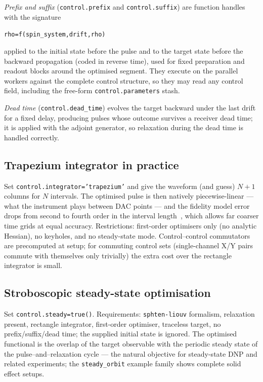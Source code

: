 \documentclass[11pt,a4paper]{article}
\newcommand{\code}[1]{\texttt{#1}}
\begin{document}
\emph{Prefix and suffix} (\code{control.prefix} and
\code{control.suffix}) are function handles with the signature
\begin{center}
\code{rho=f(spin\_system,drift,rho)}
\end{center}
applied to the initial state before the pulse and to the target state
before the backward propagation (coded in reverse time), used for fixed
preparation and readout blocks around the optimised segment. They execute on the parallel workers
against the complete control structure, so they may read any control
field, including the free-form \code{control.parameters} stash.

\emph{Dead time} (\code{control.dead\_time}) evolves the target backward
under the last drift for a fixed delay, producing pulses whose outcome
survives a receiver dead time; it is applied with the adjoint generator,
so relaxation during the dead time is handled correctly.

\subsection{Trapezium integrator in practice}

Set \code{control.integrator='trapezium'} and give the waveform (and
guess) $N+1$ columns for $N$ intervals. The optimised pulse is then
natively piecewise-linear --- what the instrument plays between DAC
points --- and the fidelity model error drops from second to fourth
order in the interval length~\cite{rasulov2023}, which allows far
coarser time grids at equal accuracy. Restrictions: first-order
optimisers only (no analytic Hessian), no keyholes, and no steady-state
mode. Control--control commutators are precomputed at setup; for
commuting control sets (single-channel X/Y pairs commute with themselves
only trivially) the extra cost over the rectangle integrator is small.

\subsection{Stroboscopic steady-state optimisation}

Set \code{control.steady=true()}. Requirements: \code{sphten-liouv}
formalism, relaxation present, rectangle integrator, first-order
optimiser, traceless target, no prefix/suffix/dead time; the supplied
initial state is ignored. The optimised functional is the overlap of the
target observable with the periodic steady state of the
pulse--and--relaxation cycle --- the natural objective for steady-state
DNP and related experiments; the \code{steady\_orbit} example family
shows complete solid effect setups.
\end{document}

